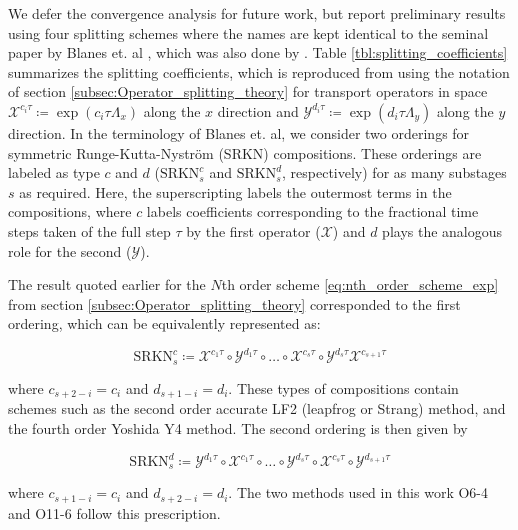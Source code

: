\documentclass[11pt,titlepage]{report}
\begin{document}
We defer the convergence analysis for future work, but report preliminary results using four splitting schemes where the names are kept identical to the seminal paper by Blanes et. al \cite{Blanes02}, which was also done by \cite{Guclu14}. Table \ref{tbl:splitting_coefficients} summarizes the splitting coefficients, which is reproduced from \cite{Blanes02} using the notation of section \ref{subsec:Operator_splitting_theory} for transport operators in space $\mathcal{X}^{c_i\tau} \coloneqq \exp(c_i\tau\Lambda_x)$ along the $x$ direction and $\mathcal{Y}^{d_i\tau} \coloneqq \exp(d_i\tau\Lambda_y)$ along the $y$ direction.  In the terminology of Blanes et. al, we consider two orderings for symmetric Runge-Kutta-Nystr\"{o}m (SRKN) compositions. These orderings are labeled as type $c$ and $d$ ($\text{SRKN}_s^c$ and $\text{SRKN}_s^d$, respectively) for as many substages $s$ as required. Here, the superscripting labels the outermost terms in the compositions, where $c$ labels coefficients corresponding to the fractional time steps taken of the full step $\tau$ by the first operator ($\mathcal{X}$) and $d$ plays the analogous role for the second ($\mathcal{Y}$).

The result quoted earlier for the $N$th order scheme \eqref{eq:nth_order_scheme_exp} from section \ref{subsec:Operator_splitting_theory} corresponded to the first ordering, which can be equivalently represented as:

\begin{equation}\text{SRKN}_s^c \coloneqq \mathcal{X}^{c_1\tau}\circ\mathcal{Y}^{d_1\tau}\circ \ldots \circ \mathcal{X}^{c_s\tau}\circ\mathcal{Y}^{d_s\tau}\mathcal{X}^{c_{s+1}\tau} \label{eq:SRKN_sc}
\end{equation}

\noindent where $c_{s+2-i} = c_i$ and $d_{s+1-i} = d_i$. These types of compositions contain schemes such as the second order accurate LF2 (leapfrog or Strang) method, and the fourth order Yoshida Y4 method. The second ordering is then given by

\begin{equation}\text{SRKN}_s^d \coloneqq \mathcal{Y}^{d_1\tau}\circ\mathcal{X}^{c_1\tau} \circ \ldots \circ \mathcal{Y}^{d_s\tau}\circ\mathcal{X}^{c_s\tau}\circ\mathcal{Y}^{d_{s+1}\tau} \label{eq:SRKN_sd}
\end{equation}

\noindent where $c_{s+1-i} = c_i$ and $d_{s+2-i} = d_i$. The two methods used in this work O6-4 and O11-6 follow this prescription.
\end{document}
